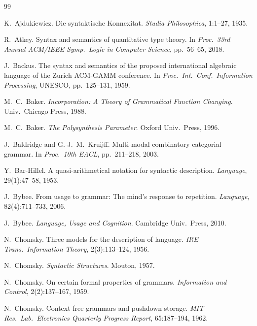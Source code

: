 \documentclass[12pt,a4paper]{article}
\begin{document}
\begin{thebibliography}{99}

K.~Ajdukiewicz.
\newblock Die syntaktische Konnexitat.
\newblock \emph{Studia Philosophica}, 1:1--27, 1935.

R.~Atkey.
\newblock Syntax and semantics of quantitative type theory.
\newblock In \emph{Proc.\ 33rd Annual ACM/IEEE Symp.\ Logic in Computer Science}, pp.~56--65, 2018.

J.~Backus.
\newblock The syntax and semantics of the proposed international algebraic language of the Zurich ACM-GAMM conference.
\newblock In \emph{Proc.\ Int.\ Conf.\ Information Processing}, UNESCO, pp.~125--131, 1959.

M.~C.~Baker.
\newblock \emph{Incorporation: A Theory of Grammatical Function Changing}.
\newblock Univ.\ Chicago Press, 1988.

M.~C.~Baker.
\newblock \emph{The Polysynthesis Parameter}.
\newblock Oxford Univ.\ Press, 1996.

J.~Baldridge and G.-J.~M.~Kruijff.
\newblock Multi-modal combinatory categorial grammar.
\newblock In \emph{Proc.\ 10th EACL}, pp.~211--218, 2003.

Y.~Bar-Hillel.
\newblock A quasi-arithmetical notation for syntactic description.
\newblock \emph{Language}, 29(1):47--58, 1953.

J.~Bybee.
\newblock From usage to grammar: The mind's response to repetition.
\newblock \emph{Language}, 82(4):711--733, 2006.

J.~Bybee.
\newblock \emph{Language, Usage and Cognition}.
\newblock Cambridge Univ.\ Press, 2010.

N.~Chomsky.
\newblock Three models for the description of language.
\newblock \emph{IRE Trans.\ Information Theory}, 2(3):113--124, 1956.

N.~Chomsky.
\newblock \emph{Syntactic Structures}.
\newblock Mouton, 1957.

N.~Chomsky.
\newblock On certain formal properties of grammars.
\newblock \emph{Information and Control}, 2(2):137--167, 1959.

N.~Chomsky.
\newblock Context-free grammars and pushdown storage.
\newblock \emph{MIT Res.\ Lab.\ Electronics Quarterly Progress Report}, 65:187--194, 1962.


\end{thebibliography}
\end{document}
